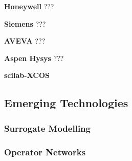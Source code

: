 \textbf{Honeywell} ???

\textbf{Siemens} ???

\textbf{AVEVA} ???

\textbf{Aspen Hysys} ???

\textbf{scilab-XCOS}



\subsection{Emerging Technologies }




\subsubsection{Surrogate Modelling}

\subsubsection{Operator Networks}



